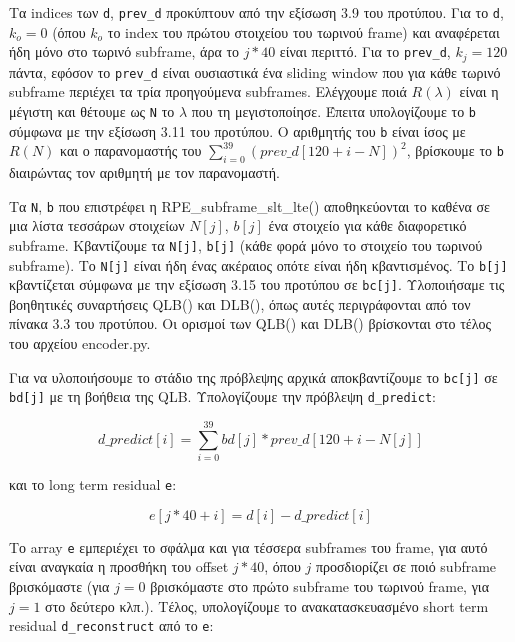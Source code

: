 \documentclass{article}
\begin{document}
Τα indices των \verb|d|, \verb|prev_d| προκύπτουν από την εξίσωση 3.9 
του προτύπου. Για το \verb|d|, $k_o = 0$ (όπου $k_o$ το index του πρώτου 
στοιχείου του τωρινού frame) και αναφέρεται ήδη μόνο στο τωρινό
subframe, άρα το $j * 40$ είναι περιττό. Για το \verb|prev_d|, 
$k_j = 120$ πάντα, εφόσον το \verb|prev_d| είναι ουσιαστικά ένα 
sliding window που για κάθε τωρινό subframe περιέχει τα τρία προηγούμενα 
subframes. Ελέγχουμε ποιά $R(\lambda)$ είναι η μέγιστη και θέτουμε 
ως \verb|N| το $\lambda$ που τη μεγιστοποίησε. Έπειτα υπολογίζουμε
το \verb|b| σύμφωνα με την εξίσωση 3.11 του προτύπου. Ο αριθμητής
του \verb|b| είναι ίσος με $R(N)$ και ο παρανομαστής του
$\sum_{i=0}^{39}(prev\_d[120 + i - N])^2$, βρίσκουμε
το \verb|b| διαιρώντας τον αριθμητή με τον παρανομαστή.

Τα \verb|N|, \verb|b| που επιστρέφει η RPE\_subframe\_slt\_lte() 
αποθηκεύονται το καθένα σε μια λίστα τεσσάρων στοιχείων $N[j]$, $b[j]$ 
ένα στοιχείο για κάθε διαφορετικό subframe. Κβαντίζουμε τα 
\verb|N[j]|, \verb|b[j]| (κάθε φορά μόνο το στοιχείο του τωρινού subframe). 
Το \verb|N[j]| είναι ήδη ένας ακέραιος οπότε
είναι ήδη κβαντισμένος. Το \verb|b[j]| κβαντίζεται σύμφωνα με την
εξίσωση 3.15 του προτύπου σε \verb|bc[j]|. Υλοποιήσαμε τις βοηθητικές 
συναρτήσεις QLB() και DLB(), όπως αυτές περιγρά\-φονται από τον πίνακα 
3.3 του προτύπου. Οι ορισμοί των QLB() και DLB() βρίσκονται στο τέλος του αρχείου
encoder.py\@.

Για να υλοποιήσουμε το στάδιο της πρόβλεψης αρχικά αποκβαντίζουμε το 
\verb|bc[j]| σε \verb|bd[j]| με τη βοήθεια της QLB. Υπολογίζουμε την πρόβλεψη 
\verb|d_predict|:

\begin{equation}\label{d_predict}
    d\_predict[i] = \sum_{i=0}^{39} bd[j] * prev\_d[120 + i - N[j]]
\end{equation}

και το long term residual \verb|e|:

\begin{equation}
    e[j*40 + i] =  d[i] - d\_predict[i]
\end{equation}

Το array \verb|e| εμπεριέχει το σφάλμα και για τέσσερα subframes του frame,
για αυτό είναι αναγκαία η προσθήκη του offset $j * 40$, όπου $j$ 
προσδιορίζει σε ποιό subframe βρισκόμαστε (για $j = 0$ βρισκόμαστε 
στο πρώτο subframe του τωρινού frame, για $j = 1$ στο δεύτερο κλπ.).
Τέλος, υπολογίζουμε το ανακατασκευασμένο short term residual 
\verb|d_reconstruct| από το \verb|e|:
\end{document}
